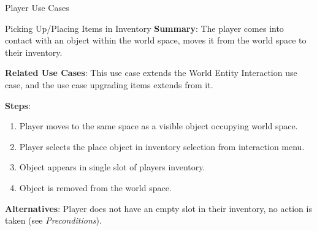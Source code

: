 \documentclass[12pt]{report}
\begin{document}
\begin{section}{Player Use Cases}
\begin{subsection}{Picking Up/Placing Items in Inventory}
      \textbf{Summary}:
      The player comes into contact with an object within the world 
      space, moves it from the world space to their inventory.

      \textbf{Related Use Cases}:
      This use case extends the World Entity Interaction use case, and the
      use case upgrading items extends from it.

      \textbf{Steps}:
      \begin{enumerate}
        \item Player moves to the same space as a visible object occupying world
	      space.
        \item Player selects the place object in inventory selection from 
	      interaction menu.
        \item Object appears in single slot of players inventory.
        \item Object is removed from the world space.
      \end{enumerate}

      \textbf{Alternatives}:
      Player does not have an empty slot in their inventory, no action is
      taken (see \textit{Preconditions}).
    \end{subsection}
  \end{section}
\end{document}
